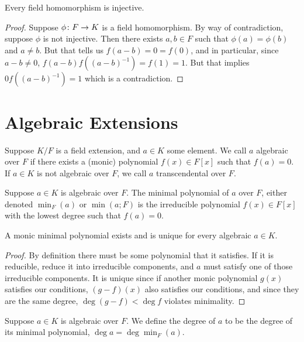 \begin{theorem}\label{thm:field-hom-injective}
    Every field homomorphism is injective.
\end{theorem}
\begin{proof}
    Suppose \(\phi\colon F\to K\) is a field homomorphism.
    By way of contradiction, suppose \(\phi\) is not injective.
    Then there exists \(a,b \in F\) such that \(\phi(a) = \phi(b)\) and \(a \neq b\).
    But that tells us \(f(a-b) = 0 = f(0)\), and in particular,
    since \(a-b \neq 0\), \(f(a-b)f({(a-b)}^{-1}) = f(1) = 1\).
    But that implies \(0f({(a-b)}^{-1}) = 1\) which is a contradiction.
\end{proof}


\section{Algebraic Extensions}\label{sec:algebraic-extensions}

\begin{definition}
    Suppose \(K/F\) is a field extension, and \(a \in K\) some element.
    We call \(a\) algebraic over \(F\)
    if there exists a (monic) polynomial \(f(x) \in F[x]\) such that \(f(a) = 0\).
    If \(a \in K\) is not algebraic over \(F\),
    we call \(a\) transcendental over \(F\).
\end{definition}

\begin{definition}
    Suppose \(a \in K\) is algebraic over \(F\).
    The minimal polynomial of \(a\) over \(F\),
    either denoted \(\min_F(a)\) or \(\min(a;F)\)
    is the irreducible polynomial \(f(x) \in F[x]\)
    with the lowest degree such that \(f(a) = 0\).
\end{definition}
\begin{proposition}
    A monic minimal polynomial exists and is unique for every algebraic \(a \in K\).
\end{proposition}
\begin{proof}
    By definition there must be some polynomial that it satisfies.
    If it is reducible, reduce it into irreducible components,
    and \(a\) must satisfy one of those irreducible components.
    It is unique since if another monic polynomial \(g(x)\) satisfies our conditions,
    \((g-f)(x)\) also satisfies our conditions,
    and since they are the same degree, \(\deg(g-f) < \deg f\) violates minimality.
\end{proof}
\begin{definition}
    Suppose \(a \in K\) is algebraic over \(F\).
    We define the degree of \(a\) to be the degree of its minimal polynomial,
    \(\deg a = \deg \min_F(a)\).
\end{definition}


